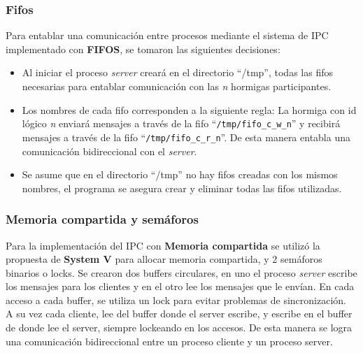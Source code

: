 \documentclass[a4paper,10pt]{article}
\begin{document}
\subsubsection{Fifos}
Para entablar una comunicación entre procesos mediante el sistema de IPC implementado con \textbf{FIFOS}, se tomaron las siguientes decisiones:
\begin{itemize}
 \item Al iniciar el proceso \textit{server} creará en el directorio ``/tmp'', todas las fifos necesarias para entablar comunicación 
con las \textit{n} hormigas participantes.
 \item Los nombres de cada fifo corresponden a la siguiente regla: La hormiga con id lógico \textit{n} enviará mensajes a través de la fifo 
``\verb|/tmp/fifo_c_w_n|'' y recibirá mensajes a través de la fifo ``\verb|/tmp/fifo_c_r_n|''. De esta manera entabla una comunicación
bidireccional con el \textit{server}.
  \item Se asume que en el directorio ``/tmp'' no hay fifos creadas con los mismos nombres, el programa se asegura crear y eliminar todas las 
fifos utilizadas.
\end{itemize}

\subsubsection{Memoria compartida y semáforos}
Para la implementación del IPC con \textbf{Memoria compartida} se utilizó la propuesta de \textbf{System V} para allocar memoria compartida, y 
2 semáforos binarios o locks.
Se crearon dos buffers circulares, en uno el proceso \textit{server} escribe los mensajes para los clientes y en el otro lee los mensajes que
le envían. En cada acceso a cada buffer, se utiliza un lock para evitar problemas de sincronización.\\
A su vez cada cliente, lee del buffer donde el server escribe, y escribe en el buffer de donde lee el server, siempre lockeando en los accesos.
De esta manera se logra una comunicación bidireccional entre un proceso cliente y un proceso server.
\end{document}

